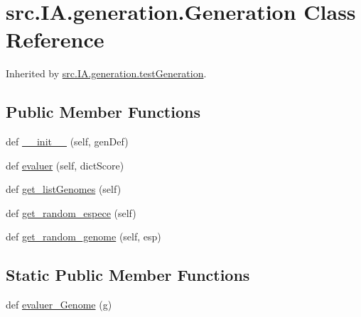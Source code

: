 \hypertarget{classsrc_1_1_i_a_1_1generation_1_1_generation}{}\section{src.\+I\+A.\+generation.\+Generation Class Reference}
\label{classsrc_1_1_i_a_1_1generation_1_1_generation}


Inherited by \hyperlink{classsrc_1_1_i_a_1_1generation_1_1test_generation}{src.\+I\+A.\+generation.\+test\+Generation}.

\subsection*{Public Member Functions}
\begin{DoxyCompactItemize}
\item 
def \hyperlink{classsrc_1_1_i_a_1_1generation_1_1_generation_af1a9b4e0d54cf2d95b643ee32f0a7785}{\+\_\+\+\_\+init\+\_\+\+\_\+} (self, gen\+Def)
\item 
def \hyperlink{classsrc_1_1_i_a_1_1generation_1_1_generation_a78b1356928bb19d81bd0f231c8a64e1f}{evaluer} (self, dict\+Score)
\item 
def \hyperlink{classsrc_1_1_i_a_1_1generation_1_1_generation_a9455cb1f619593f816b4fafc6745a9c3}{get\+\_\+list\+Genomes} (self)
\item 
def \hyperlink{classsrc_1_1_i_a_1_1generation_1_1_generation_a2eb297f2df213ec76e73ff2fc0859646}{get\+\_\+random\+\_\+espece} (self)
\item 
def \hyperlink{classsrc_1_1_i_a_1_1generation_1_1_generation_a71f3acb01620d956f34f37c0abb0a6ec}{get\+\_\+random\+\_\+genome} (self, esp)
\end{DoxyCompactItemize}
\subsection*{Static Public Member Functions}
\begin{DoxyCompactItemize}
\item 
def \hyperlink{classsrc_1_1_i_a_1_1generation_1_1_generation_af7a89bc3cb3233adbef8705ab32c36d2}{evaluer\+\_\+\+Genome} (g)
\end{DoxyCompactItemize}
